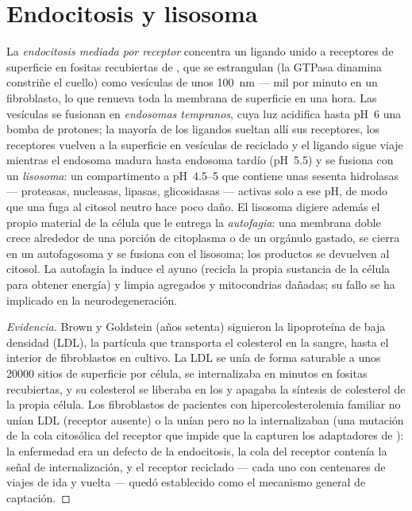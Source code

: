 \section{Endocitosis y lisosoma}

\begin{definition}[Endocitosis]\label{def:b3:membrane-traffic:endocytosis}
La \emph{endocitosis mediada por receptor} concentra un ligando unido a
receptores de superficie en fositas recubiertas de , que se
estrangulan (la GTPasa dinamina constriñe el cuello) como vesículas de
unos \qty{100}{nm} --- mil por minuto en un fibroblasto, lo que renueva
toda la membrana de superficie en una hora. Las vesículas se fusionan en
\emph{endosomas tempranos}, cuya luz acidifica hasta pH~6 una bomba de
protones; la mayoría de los ligandos sueltan allí sus receptores, los
receptores vuelven a la superficie en vesículas de reciclado y el ligando
sigue viaje mientras el endosoma madura hasta endosoma tardío (pH~5.5) y
se fusiona con un \emph{lisosoma}: un compartimento a pH~4.5--5 que
contiene unas sesenta hidrolasas --- proteasas, nucleasas, lipasas,
glicosidasas --- activas solo a ese pH, de modo que una fuga al citosol
neutro hace poco daño. El lisosoma digiere además el propio material de
la célula que le entrega la \emph{autofagia}: una membrana doble crece
alrededor de una porción de citoplasma o de un orgánulo gastado, se
cierra en un autofagosoma y se fusiona con el lisosoma; los productos se
devuelven al citosol. La autofagia la induce el ayuno (recicla la propia
sustancia de la célula para obtener energía) y limpia agregados y
mitocondrias dañadas; su fallo se ha implicado en la neurodegeneración.
\end{definition}

\begin{proof}[Evidencia]
Brown y Goldstein (años setenta) siguieron la lipoproteína de baja
densidad (LDL), la partícula que transporta el colesterol en la sangre,
hasta el interior de fibroblastos en cultivo. La LDL se unía de forma
saturable a unos \num{20000} sitios de superficie por célula, se
internalizaba en minutos en fositas recubiertas, y su colesterol se
liberaba en los  y apagaba la síntesis de colesterol de la
propia célula. Los fibroblastos de pacientes con hipercolesterolemia
familiar no unían LDL (receptor ausente) o la unían pero no la
internalizaban (una mutación de la cola citosólica del receptor que
impide que la capturen los adaptadores de ): la enfermedad era un
defecto de la endocitosis, la cola del receptor contenía la señal de
internalización, y el receptor reciclado --- cada uno con centenares de
viajes de ida y vuelta --- quedó establecido como el mecanismo general de
captación.
\end{proof}

